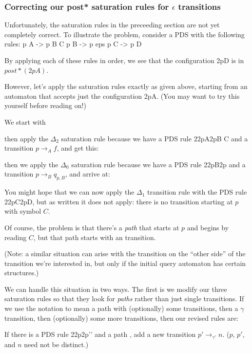 \documentclass{article}
\newcommand{\config}{2}{\ensuremath{\langle #1, #2 \rangle}}
\newcommand{\rule}{2}{\ensuremath{#1 \righthookarrow #2}}
\newcommand{\trans}[3]{\ensuremath{#1 \rightarrow_{#2} #3}}
\begin{document}
\begin{defintion}
\subsubsection{Correcting our post* saturation rules for $\epsilon$
  transitions}

Unfortunately, the saturation rules in the preceeding section are not
yet completely correct. To illustrate the problem, consider a PDS with
the following rules:
   p A -> p B C
   p B -> p eps
   p C -> p D

By applying each of these rules in order, we see that the
configuration \config{p}{D} is in $post*(\config{p}{A})$.

However, let's apply the saturation rules exactly as given above,
starting from an automaton that accepts just the configuration
\config{p}{A}. (You may want to try this yourself before reading on!)

We start with

then apply the $\Delta_2$ saturation rule because we have a PDS rule
\rule{\config{p}{A}}{\rule{p}{B C}} and a transition \trans{p}{A}{f},
and get this:

then we apply the $\Delta_0$ saturation rule because we have a PDS
rule \rule{\config{p}{B}}{\config{p}{\epsilon}} and a transition
\trans{p}{B}{q_{p,B}}, and arrive at:

You might hope that we can now apply the $\Delta_1$ transition rule
with the PDS rule \rule{\config{p}{C}}{\config{p}{D}}, but as written
it does not apply: there is no transition starting at $p$ with symbol
$C$.

Of course, the problem is that there's a \emph{path} that starts at
$p$ and begins by reading $C$, but that path starts with an \epsilon
transition.

(Note: a similar situation can arise with the \epsilon transition on
the ``other side'' of the transition we're interested in, but only if
the initial query automaton has certain structures.)

We can handle this situation in two ways. The first is we modify our
three saturation rules so that they look for \emph{paths} rather than
just single transitions. If we use the notation 
to mean a path with (optionally) some \epsilon transitions, then a
$\gamma$ transition, then (optionally) some more \epsilon transitions,
then our revised rules are:


   If there is a PDS rule
   \rule{\config{p}{\gamma}}{\config{p'}{\gamma'}} and a path
   , add a new transition
   \trans{p'}{\gamma'}{n}. ($p$, $p'$, and $n$ need not be distinct.)


\end{defintion}
\end{document}
